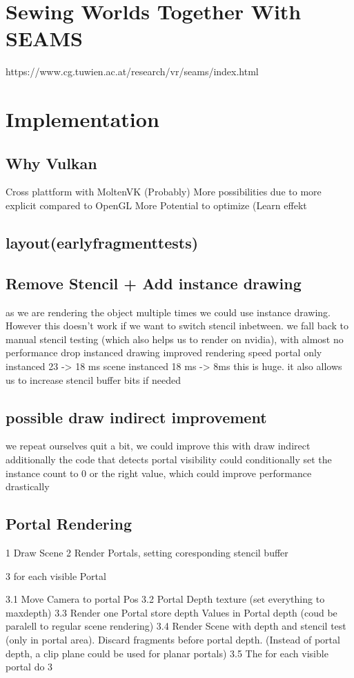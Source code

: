 
\section{Sewing Worlds Together With SEAMS}
https://www.cg.tuwien.ac.at/research/vr/seams/index.html
\section{Implementation}
\subsection{Why Vulkan}
Cross plattform with MoltenVK
(Probably) More possibilities due to more explicit compared to OpenGL
More Potential to optimize
(Learn effekt


\subsection{layout(earlyfragmenttests)}

\subsection{Remove Stencil + Add instance drawing}
as we are rendering the object multiple times we could use instance drawing. However this doesn't work if we want to switch stencil inbetween.
we fall back to manual stencil testing (which also helps us to render on nvidia), with almost no performance drop
instanced drawing improved rendering speed portal only instanced 23 -> 18 ms
scene instanced 18 ms -> 8ms
this is huge.
it also allows us to increase stencil buffer bits if needed

\subsection{possible draw indirect improvement}
we repeat ourselves quit a bit, we could improve this with draw indirect
additionally the code that detects portal visibility could conditionally set the instance count to 0 or the right value, which could improve performance drastically

\subsection{Portal Rendering}
1 Draw Scene
2 Render Portals, setting coresponding stencil buffer

3 for each visible Portal

3.1 Move Camera to portal Pos
3.2 Portal Depth texture (set everything to maxdepth)
3.3 Render one Portal store depth Values in Portal depth (coud be paralell to regular scene rendering)
3.4 Render Scene with depth and stencil test (only in portal area). Discard fragments before portal depth.
(Instead of portal depth, a clip plane could be used for planar portals)
3.5 The for each visible portal do 3

